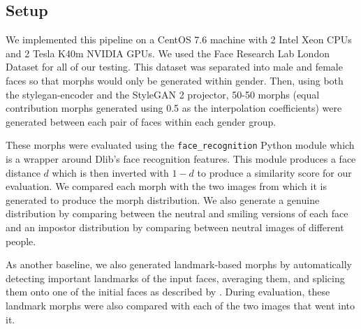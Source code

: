 \documentclass[12pt,twocolumn]{paper}
\begin{document}
\subsection{Setup}
\par
We implemented this pipeline on a CentOS 7.6 machine with 2 Intel Xeon CPUs and 2 Tesla K40m NVIDIA GPUs. We used the Face Research Lab London Dataset \cite{london} for all of our testing. This dataset was separated into male and female faces so that morphs would only be generated within gender. Then, using both the stylegan-encoder and the StyleGAN 2 projector, 50-50 morphs (equal contribution morphs generated using 0.5 as the interpolation coefficients) were generated between each pair of faces within each gender group.
\par
These morphs were evaluated using the \texttt{face\_recognition} Python module which is a wrapper around Dlib's face recognition features. This module produces a face distance $d$ which is then inverted with $1-d$ to produce a similarity score for our evaluation. We compared each morph with the two images from which it is generated to produce the morph distribution. We also generate a genuine distribution by comparing between the neutral and smiling versions of each face and an impostor distribution by comparing between neutral images of different people.
\par
As another baseline, we also generated landmark-based morphs by automatically detecting important landmarks of the input faces, averaging them, and splicing them onto one of the initial faces as described by \cite{visapp17}. During evaluation, these landmark morphs were also compared with each of the two images that went into it.
\end{document}
